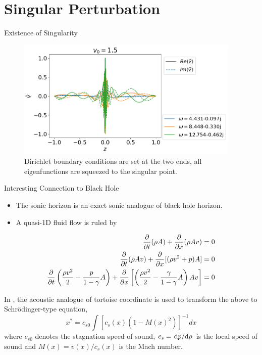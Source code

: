 \section{Singular Perturbation}
\begin{frame}{Existence of Singularity}
  \begin{figure}[htbp]
  \begin{center}
    \includegraphics[width=0.95\textwidth]{figures/results-bad-accelerating-v.png}
  \end{center}
  \caption{Dirichlet boundary conditions are set at the two ends, all eigenfunctions are squeezed to the singular point.}
  \label{fig:bad-accelerating-v}
\end{figure}


\end{frame}

\begin{frame}{Interesting Connection to Black Hole}
 \begin{itemize}
  \item The sonic horizon is an exact sonic analogue of black hole horizon. \cite{unruh_sonic_1995}
  \item A quasi-1D fluid flow is ruled by \cite{da_rocha_black_2017}
 \end{itemize}
\begin{align} \label{eq:euler-lagrange}
  \pdv{t}(\rho A) + \pdv{x}(\rho A v) &= 0 \\
  \pdv{t}(\rho A v) + \pdv{x}[(\rho v^2 + p)A] &= 0 \\
  \pdv{t}\left(\frac{\rho v^2}{2} - \frac{p}{1-\gamma}A\right) +
  \pdv{x}\left[ \left(\frac{\rho v^2}{2} - \frac{\gamma}{1-\gamma}A\right)Av \right] &= 0
\end{align}

In \cite{da_rocha_black_2017, furuhashi_simulation_2006}, the acoustic analogue of tortoise coordinate is used to transform the above to Schr{\"o}dinger-type equation,
\[ x^* = c_{s0}\int [c_s(x)(1-M(x)^2)]^{-1} dx \]
where $c_{s0}$ denotes the stagnation speed of sound, $c_s = \dv*{p}{\rho}$ is the local speed of sound and $M(x)= v(x)/c_s(x)$ is the Mach number.
\end{frame}

